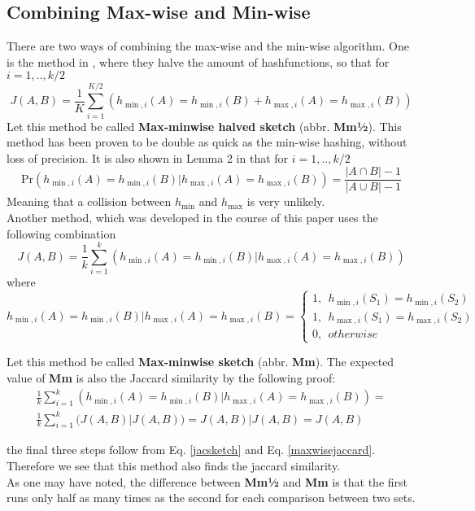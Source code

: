\documentclass[../../main.tex]{subfiles}
\begin{document}
\subsection{Combining Max-wise and Min-wise}

There are two ways of combining the max-wise and the min-wise algorithm. One is the method in \cite{minmaxhash}, where they halve the amount of hashfunctions, so that for $i=1,..,k/2$
\begin{equation}\label{minmaxhalfjaccard}
J(A,B)=\frac{1}{K}\sum_{i=1}^{K/2}(h_{\min,i}(A) = h_{\min,i}(B) + h_{\max,i}(A) = h_{\max,i}(B))
\end{equation}
Let this method be called \textbf{Max-minwise halved sketch} (abbr. {\bf Mm½}). This method has been proven to be double as quick as the min-wise hashing, without loss of precision\cite{minmaxhash}. It is also shown in Lemma 2 in \cite{minmaxhash} that for $i=1,..,k/2$
$$
\mathrm{Pr}(h_{\min,i}(A) = h_{\min,i}(B) | h_{\max,i}(A) = h_{\max,i}(B)) = \frac{|A\cap B|-1}{|A\cup B| -1}
$$
Meaning that a collision between $h_{\min}$ and $h_{\max}$ is very unlikely.\\

Another method, which was developed in the course of this paper uses the following combination
\begin{equation}\label{minmaxjaccard}
J(A,B)=\frac{1}{k}\sum_{i=1}^{k}(h_{\min,i}(A) = h_{\min,i}(B) | h_{\max,i}(A) = h_{\max,i}(B))
\end{equation}
where
$$
h_{\min,i}(A) = h_{\min,i}(B) | h_{\max,i}(A) = h_{\max,i}(B) = \left\{ \begin{array}{ll}
												1, \ \ h_{\min,i}(S_1)=h_{\min,i}(S_2)\\
												1, \ \ h_{\max,i}(S_1)=h_{\max,i}(S_2)\\
												0, \ \ otherwise
											  \end{array}\right.
$$

Let this method be called \textbf{Max-minwise sketch} (abbr. {\bf Mm}). The expected value of {\bf Mm} is also the Jaccard similarity by the following proof:\\
\begin{equation}\label{proofofMinmax}
\begin{split}
\frac{1}{k}\sum_{i=1}^{k}(h_{\min,i}(A) = h_{\min,i}(B) | h_{\max,i}(A) = h_{\max,i}(B)) =\\\frac{1}{k}\sum_{i=1}^{k}(J(A,B) | J(A,B)) = J(A,B)|J(A,B) = J(A,B)
\end{split}
\end{equation}

the final three steps follow from Eq. \ref{jacsketch} and Eq. \ref{maxwisejaccard}. Therefore we see that this method also finds the jaccard similarity.\\

As one may have noted, the difference between \textbf{Mm½} and \textbf{Mm} is that the first runs only half as many times as the second for each comparison between two sets.
\end{document}
